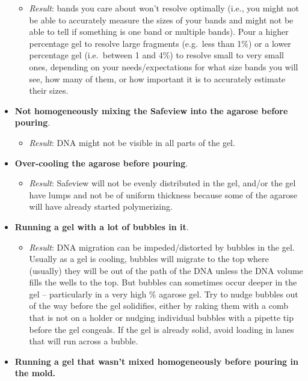 \documentclass[
  letterpaper,
  DIV=11,
  numbers=noendperiod]{scrreprt}
\providecommand{\tightlist}{%
  \setlength{\itemsep}{0pt}\setlength{\parskip}{0pt}}\usepackage{longtable,booktabs,array}
\begin{document}
\begin{itemize}
  \begin{itemize}
  \tightlist
  \item
    \emph{Result}: bands you care about won't resolve optimally (i.e.,
    you might not be able to accurately measure the sizes of your bands
    and might not be able to tell if something is one band or multiple
    bands). Pour a higher percentage gel to resolve large fragments
    (e.g.~less than 1\%) or a lower percentage gel (i.e.~between 1 and
    4\%) to resolve small to very small ones, depending on your
    needs/expectations for what size bands you will see, how many of
    them, or how important it is to accurately estimate their sizes.
  \end{itemize}
\item
  \textbf{Not homogeneously mixing the Safeview into the agarose before
  pouring}.

  \begin{itemize}
  \tightlist
  \item
    \emph{Result}: DNA might not be visible in all parts of the gel.
  \end{itemize}
\item
  \textbf{Over-cooling the agarose before pouring}.

  \begin{itemize}
  \tightlist
  \item
    \emph{Result}: Safeview will not be evenly distributed in the gel,
    and/or the gel have lumps and not be of uniform thickness because
    some of the agarose will have already started polymerizing.
  \end{itemize}
\item
  \textbf{Running a gel with a lot of bubbles in it}.

  \begin{itemize}
  \tightlist
  \item
    \emph{Result}: DNA migration can be impeded/distorted by bubbles in
    the gel. Usually as a gel is cooling, bubbles will migrate to the
    top where (usually) they will be out of the path of the DNA unless
    the DNA volume fills the wells to the top. But bubbles can sometimes
    occur deeper in the gel -- particularly in a very high \% agarose
    gel. Try to nudge bubbles out of the way before the gel solidifies,
    either by raking them with a comb that is not on a holder or nudging
    individual bubbles with a pipette tip before the gel congeals. If
    the gel is already solid, avoid loading in lanes that will run
    across a bubble.
  \end{itemize}
\item
  \textbf{Running a gel that wasn't mixed homogeneously before pouring
  in the mold.}


\end{itemize}
\end{document}
